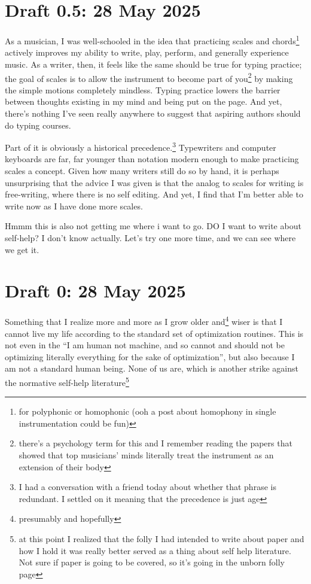 \documentclass[12pt]{article}
\newcommand{\say}[1]{``#1''}
\renewcommand{\,}{\textsuperscript{,}}
\begin{document}
\section{Draft 0.5: 28 May 2025}

As a musician, I was well-schooled in the idea that practicing scales and chords\footnote{for polyphonic or homophonic (ooh a post about homophony in single instrumentation could be fun)} actively improves my ability to write, play, perform, and generally experience music.  
As a writer, then, it feels like the same should be true for typing practice; the goal of scales is to allow the instrument to become part of you\footnote{there's a psychology term for this and I remember reading the papers that showed that top musicians' minds literally treat the instrument as an extension of their body} by making the simple motions completely mindless.  
Typing practice lowers the barrier between thoughts existing in my mind and being put on the page.  
And yet, there's nothing I've seen really anywhere to suggest that aspiring authors should do typing courses.

Part of it is obviously a historical precedence.\footnote{I had a conversation with a friend today about whether that phrase is redundant. I settled on it meaning that the precedence is just age} 
Typewriters and computer keyboards are far, far younger than notation modern enough to make practicing scales a concept.  
Given how many writers still do so by hand, it is perhaps unsurprising that the advice I was given is that the analog to scales for writing is free-writing, where there is no self editing.  
And yet, I find that I'm better able to write now as I have done more scales.

Hmmm this is also not getting me where i want to go.  
DO I want to write about self-help?  
I don't know actually.  
Let's try one more time, and we can see where we get it.


\section{Draft 0: 28 May 2025}

Something that I realize more and more as I grow older and\footnote{presumably and hopefully} wiser is that I cannot live my life according to the standard set of optimization routines.  
This is not even in the \say{I am human not machine, and so cannot and should not be optimizing literally everything for the sake of optimization}, but also because I am not a standard human being.  
None of us are, which is another strike against the normative self-help literature\footnote{at this point I realized that the folly I had intended to write about paper and how I hold it was really better served as a thing about self help literature. Not sure if paper is going to be covered, so it's going in the unborn folly page}
\end{document}
